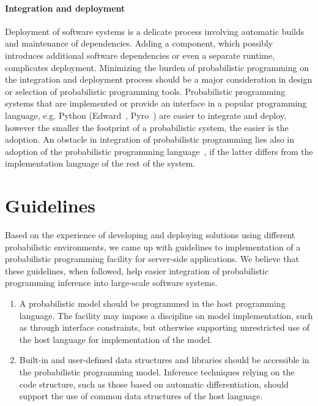 \documentclass[sigplan,review,10pt,anonymous]{acmart}
\begin{document}
\begin{sloppypar}
\paragraph{Integration and deployment} Deployment of software
systems is a delicate process involving automatic builds and
maintenance of dependencies. Adding a component, which possibly
introduces additional software dependencies or even a separate
runtime, complicates deployment. Minimizing the burden of
probabilistic programming on the integration and deployment
process should be a major consideration in design or selection
of probabilistic programming tools. Probabilistic programming
systems that are implemented or provide an interface in a
popular programming language, e.g.  Python
(Edward~\cite{THS+17}, Pyro~\cite{BCJ+19}) are easier to
integrate and deploy, however the smaller the footprint of a
probabilistic system, the easier is the adoption.
An obstacle in integration of probabilistic programming lies
also in adoption of the probabilistic programming
language~\cite{MR12}, if the latter differs from the
implementation language of the rest of the system.

\section{Guidelines}

Based on the experience of developing and deploying solutions
using different probabilistic environments, we came up with
guidelines to implementation of a probabilistic programming
facility for server-side applications. We believe that these
guidelines, when followed, help easier integration of
probabilistic programming inference into large-scale 
software systems.

\begin{enumerate}
\item A probabilistic model should be programmed in the host
programming language. The facility may impose a discipline on
model implementation, such as through interface constraints, but
otherwise supporting unrestricted use of the host language for
implementation of the model.

\item Built-in and user-defined data structures and libraries
should be accessible in the probabilistic programming model.
Inference techniques relying on the code structure, such as
those based on automatic differentiation, should support the
use of common data structures of the host language.


\end{enumerate}
\end{sloppypar}
\end{document}
